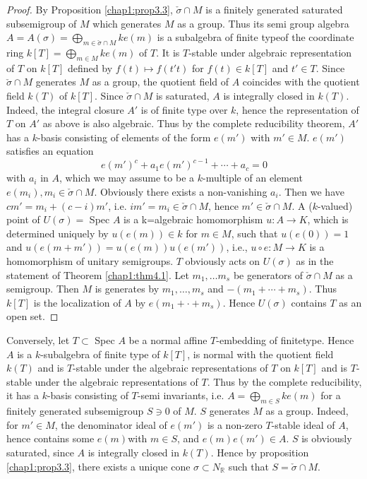 \begin{proof}
By Proposition \ref{chap1:prop3.3}, $\check{\sigma}\cap M$ is a finitely generated
saturated subsemigroup of $M$ which generates $M$ as a group. Thus its
semi group algebra $A = A (\sigma) = \bigoplus\limits_{m \in
  \check{\sigma} \cap M} ke (m)$ is a subalgebra of finite
type\pageoriginale of the  
coordinate ring $k[T] = \bigoplus\limits_{m \in M} ke (m)$ of $T$. It is
$T$-stable under algebraic representation of $T$ on $k[T]$ defined by
$f(t) \longmapsto f(t' t)$ for $f(t) \in k[T]$ and $t'\in
T$. Since $\check{\sigma} \cap M$ generates $M$ as a group, the
quotient field of $A$ coincides with the quotient field $k(T)$ of
$k[T]$. Since $\check{\sigma} \cap M$ is saturated, $A$ is integrally
closed in $k(T)$. Indeed, the integral closure $A'$ is of finite type
over $k$, hence the representation of $T$ on $A'$ as above is also
algebraic. Thus by the complete reducibility theorem, $A'$ has a
$k$-basis consisting of elements of the form $e(m')$ with $m' \in
M$. $e(m')$ satisfies an equation  
$$
e(m')^c + a_1 e(m')^{c-1} +\cdots + a_c =0  
$$
with $a_i$ in $A$, which we may assume to be a $k$-multiple of an
element $e(m_i), m_i \in \check{\sigma} \cap M$. Obviously there
exists a non-vanishing $a_i$. Then we have $cm'= m_i + (c-i)m' $,
i.e. $im' = m_i \in \check{\sigma} \cap M $, hence $m' \in
\check{\sigma}\cap M$. A ($k$-valued) point of $U(\sigma) =$ Spec $A$
is a k=algebraic homomorphism $ u : A \to K$, which is determined
uniquely by $u(e(m))\in k$ for $m \in M$, such that $u(e(0))=1$ and
$u(e(m+m'))= u(e(m))u(e(m'))$, i.e., $u \circ e: M \to K $ is a
homomorphism of unitary semigroups. $T$ obviously acts on $U(\sigma)$ as
in the statement of Theorem \ref{chap1:thm4.1}. Let $m_1, \ldots m_s$
be generators 
of $\check{\sigma} \cap M$ as a semigroup. Then $M$ is generates by
$m_1 , \ldots , m_s$ and $-(m_1 + \cdots + m_s)$. Thus $k[T]$ is the
localization of $A$ by $e(m_1 + \cdot + m_s)$. Hence $U(\sigma)$
contains $T$ as an open set.  
\end{proof}

 Conversely, let $T  \subset$ Spec $A$ be a normal affine $T$-embedding
 of finite\pageoriginale type. Hence $A$ is a $k$-subalgebra of finite
 type of 
 $k[T]$, is normal with the quotient field $k(T)$ and is $T$-stable
 under the algebraic representations of $T$ on $k[T]$ and is $T$-stable
 under the algebraic representations of $T$. Thus by the complete
 reducibility, it has a $k$-basis consisting of $T$-semi invariants,
 i.e. $A = \bigoplus\limits_{m\in S} ke(m)$ for a finitely generated
 subsemigroup $S \ni 0$ of $M$. $S$ generates $M$ as a group. Indeed,
 for $m' \in M$, the denominator ideal of $e(m')$ is a non-zero
 $T$-stable ideal of $A$, hence contains some $e(m) $with $m \in S$, and
 $e(m) e(m') \in A$. $S$ is obviously saturated, since $A$ is
 integrally closed in $k(T)$. Hence by proposition
 \ref{chap1:prop3.3}, there exists 
 a unique cone $\sigma \subset N_\mathbb{R}$ such that $ S =
 \check{\sigma}\cap M$.  

